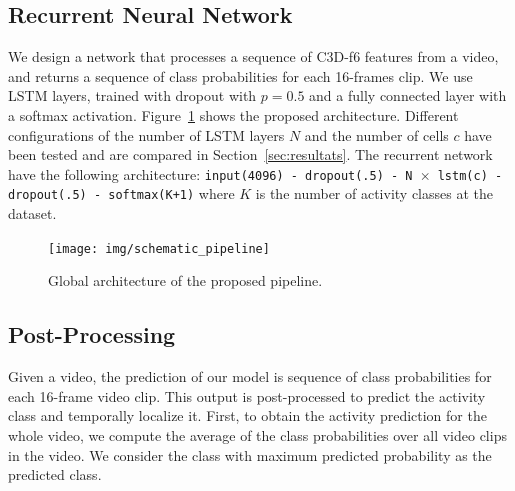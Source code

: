 \documentclass{article}
\begin{document}
\subsection{Recurrent Neural Network}
\label{sec:architecture}
We design a network that processes a sequence of C3D-f6 features from a video, and returns a sequence of class probabilities for each 16-frames clip. We use LSTM layers, trained with dropout with $p = 0.5$ and a fully connected layer with a softmax activation. Figure~\ref{fig:global_pipeline} shows the proposed architecture. Different configurations of the number of LSTM layers $N$ and the number of cells $c$ have been tested and are compared in Section~\ref{sec:resultats}. The recurrent network have the following architecture: \texttt{input(4096) - dropout(.5) - N $\times$ lstm(c) - dropout(.5) - softmax(K+1)} where $K$ is the number of activity classes at the dataset.

\begin{figure}[ht]
\centering
\texttt{[image: img/schematic\_pipeline]}
\caption{Global architecture of the proposed pipeline.}
\label{fig:global_pipeline}
\end{figure}




\subsection{Post-Processing}
Given a video, the prediction of our model is sequence of class probabilities for each 16-frame video clip. This output is post-processed to predict the activity class and temporally localize it.
First, to obtain the activity prediction for the whole video, we compute the average of the class probabilities over all video clips in the video.
We consider the class with maximum predicted probability as the predicted class.

\end{document}
